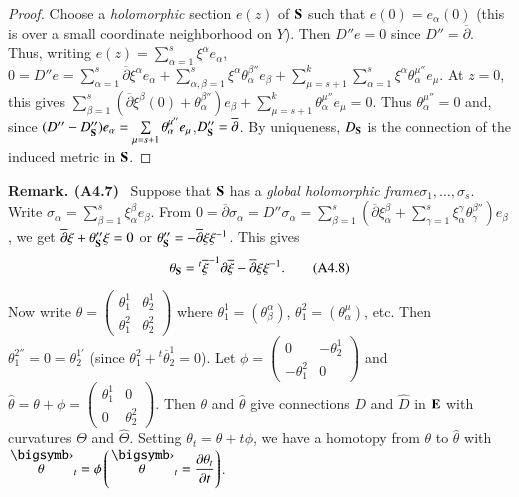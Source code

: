 \begin{proof}
Choose a {\em holomorphic} section $e(z)$ of $\mathbf{S}$ such that $e(0)=e_{\alpha}(0)$ (this is over a small coordinate neighborhood on $Y$). Then $D''e=0$ since $D''=\overline{\partial}$. Thus, writing $e(z)=\sum\limits^{s}_{\alpha=1}\xi^{\alpha}e_{\alpha}$, $0=D''e=\sum\limits^{s}_{\alpha=1}\overline{\partial}\xi^{\alpha}e_{\alpha}+\sum\limits^{s}_{\alpha,\beta=1}\xi^{\alpha}\theta^{\beta''}_{\alpha}e_{\beta}+\sum\limits^{k}_{\mu=s+1}\sum\limits^{s}_{\alpha=1}\xi^{\alpha}\theta^{\mu''}_{\alpha}e_{\mu}$. At $z=0$, this gives $\sum\limits^{s}_{\beta=1}(\overline{\partial}\xi^{\beta}(0)+\theta^{\beta''}_{\alpha})e_{\beta}+\sum\limits^{k}_{\mu=s+1}\theta^{\mu''}_{\alpha}e_{\mu}=0$. Thus $\theta^{\mu''}_{\alpha}=0$ and, since $(D''-D''_{\mathbf{S}})e_{\alpha}=\sum\limits_{\mu=s+1}\theta^{\mu''}_{\alpha}e_{\mu}$,\pageoriginale $D''_{\mathbf{S}}=\overline{\partial}$. By uniqueness, $D_{\mathbf{S}}$ is the connection of the induced metric in $\mathbf{S}$.
\end{proof}

\medskip
\noindent
{\bf Remark. (A4.7)}~ Suppose that $\mathbf{S}$ has a {\em global holomorphic frame}\break $\sigma_{1},\ldots,\sigma_{s}$. Write $\sigma_{\alpha}=\sum\limits^{s}_{\beta=1}\xi^{\beta}_{\alpha}e_{\beta}$. From $0=\overline{\partial}\sigma_{\alpha}=D''\sigma_{\alpha}=\sum\limits^{s}_{\beta=1}(\overline{\partial}\xi^{\beta}_{\alpha}+\sum\limits^{s}_{\gamma=1}\xi^{\gamma}_{\alpha}\theta^{\beta''}_{\gamma})e_{\beta}$, we get $\overline{\partial}\xi+\theta''_{\mathbf{S}}\xi=0$ or $\theta''_{\mathbf{S}}=-\overline{\partial}\xi\xi^{-1}$. This gives
\begin{equation*}
\theta_{\mathbf{S}}={}^{t}\overline{\xi}^{-1}\partial \overline{\xi}-\overline{\partial}\xi\xi^{-1}.\tag{A4.8}\label{art08-sec4-eqA4.8}
\end{equation*}

Now write $\theta=\left(\begin{smallmatrix} \theta^{1}_{1} & \theta^{1}_{2}\\ \theta^{2}_{1} & \theta^{2}_{2}\end{smallmatrix}\right)$ where $\theta^{1}_{1}=(\theta^{\alpha}_{\beta})$, $\theta^{2}_{1}=(\theta^{\mu}_{\alpha})$, etc. Then $\theta^{2''}_{1}=0=\theta^{1'}_{2}$ (since $\theta^{2}_{1}+{}^{t}\overline{\theta}^{1}_{2}=0$). Let $\phi=\left(\begin{smallmatrix} 0 & - \theta^{1}_{2}\\ -\theta^{2}_{1} & 0\end{smallmatrix}\right)$ and $\widehat{\theta}=\theta+\phi=\left(\begin{smallmatrix} \theta^{1}_{1} & 0\\ 0 & \theta^{2}_{2}\end{smallmatrix}\right)$. Then $\theta$ and $\widehat{\theta}$ give connections $D$ and $\widehat{D}$ in $\mathbf{E}$ with curvatures $\Theta$ and $\widehat{\Theta}$. Setting $\theta_{t}=\theta+t\phi$, we have a homotopy from $\theta$ to $\widehat{\theta}$ with $\overdot{\theta}_{t}=\phi\left(\overdot{\theta}_{t}=\dfrac{\partial \theta_{t}}{\partial t}\right)$.

